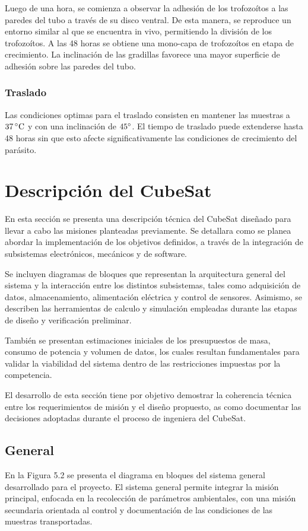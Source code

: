     Luego de una hora, se comienza a observar la adhesión de los trofozoítos a las paredes del
    tubo a través de su disco ventral. De esta manera, se reproduce un entorno similar al que se
    encuentra in vivo, permitiendo la división de los trofozoítos. A las 48 horas se obtiene una
    mono-capa de trofozoítos en etapa de crecimiento. La inclinación de las gradillas favorece
    una mayor superficie de adhesión sobre las paredes del tubo.

    \subsubsection{Traslado}
    Las condiciones optimas para el traslado consisten en mantener las muestras a $37\,^\circ\mathrm{C}$ y con
    una inclinación de $45^{\circ}$. El tiempo de traslado puede extenderse hasta 48 horas sin que esto
    afecte significativamente las condiciones de crecimiento del parásito.

\section{Descripción del CubeSat}
En esta sección se presenta una descripción técnica del CubeSat diseñado para llevar a
cabo las misiones planteadas previamente. Se detallara como se planea abordar la implementación de
los objetivos definidos, a través de la integración de subsistemas electrónicos, mecánicos y de software.

Se incluyen diagramas de bloques que representan la arquitectura general del sistema y la
interacción entre los distintos subsistemas, tales como adquisición de datos, almacenamiento,
alimentación eléctrica y control de sensores. Asimismo, se describen las herramientas de
calculo y simulación empleadas durante las etapas de diseño y verificación preliminar.

También se presentan estimaciones iniciales de los presupuestos de masa, consumo de
potencia y volumen de datos, los cuales resultan fundamentales para validar la viabilidad del
sistema dentro de las restricciones impuestas por la competencia.

El desarrollo de esta sección tiene por objetivo demostrar la coherencia técnica entre los
requerimientos de misión y el diseño propuesto, as como documentar las decisiones adoptadas
durante el proceso de ingeniera del CubeSat.

  \subsection{General}
    En la Figura 5.2 se presenta el diagrama en bloques del sistema general desarrollado para
    el proyecto. El sistema general permite integrar la misión principal, enfocada en la recolección
    de parámetros ambientales, con una misión secundaria orientada al control y documentación de
    las condiciones de las muestras transportadas.

